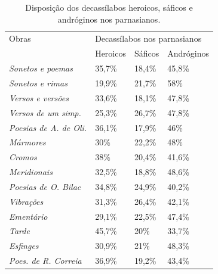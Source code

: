 \documentclass[portuguese]{textolivre}
\begin{document}
\begin{table}[htbp]
\centering
\begin{threeparttable}
\caption{Disposição dos decassílabos heroicos, sáficos e andróginos nos parnasianos.}
\label{tbl4}
\begin{tabular}{llll}
\toprule
Obras & \multicolumn{3}{l}{Decassílabos nos parnasianos} \\
& Heroicos & Sáficos & Andróginos \\
\midrule
\textit{Sonetos e poemas} &
35,7\% &
18,4\% &
45,8\% \\
\textit{Sonetos e rimas} &
19,9\% &
21,7\% &
58\% \\
\textit{Versos e versões} &
33,6\% &
18,1\% &
47,8\% \\
\textit{Versos de um simp.} &
25,3\% &
26,7\% &
47,8\% \\
\textit{Poesias de A. de Oli.} &
36,1\% &
17,9\% &
46\% \\
\textit{Mármores} &
30\% &
22,2\% &
48\% \\
\textit{Cromos} &
38\% &
20,4\% &
41,6\% \\
\textit{Meridionais} &
32,5\% &
18,8\% &
48,6\% \\
\textit{Poesias de O. Bilac} &
34,8\% &
24,9\% &
40,2\% \\
\textit{Vibrações} &
31,3\% &
26,4\% &
42,1\% \\
\textit{Ementário} &
29,1\% &
22,5\% &
47,4\% \\
\textit{Tarde} &
45,7\% &
20\% &
33,7\% \\
\textit{Esfinges} &
30,9\% &
21\% &
48,3\% \\
\textit{Poes. de R. Correia} &
36,9\% &
19,2\% &
43,4\% \\
\bottomrule
\end{tabular}
\end{threeparttable}
\end{table}
\end{document}
